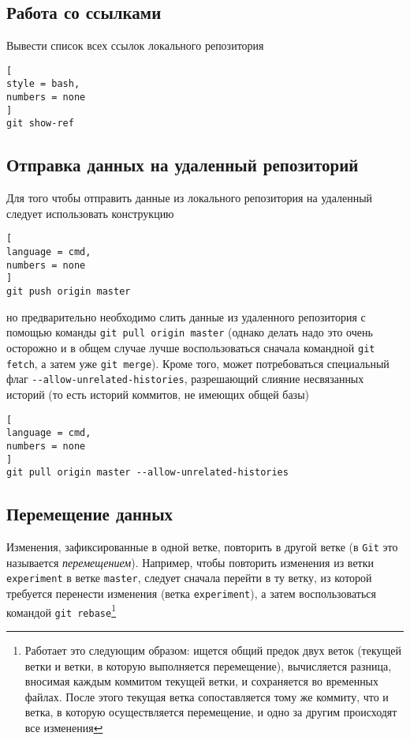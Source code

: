 \documentclass[%
	11pt,
	a4paper,
	utf8,
		]{article}
\begin{document}
\subsection{Работа со ссылками}

Вывести список всех ссылок локального репозитория
\begin{lstlisting}[
style = bash,
numbers = none
]
git show-ref
\end{lstlisting}


\subsection{Отправка данных на удаленный репозиторий}

Для того чтобы отправить данные из локального репозитория на удаленный следует использовать конструкцию

\begin{lstlisting}[
language = cmd,
numbers = none
]
git push origin master
\end{lstlisting}

\noindent но предварительно необходимо слить данные из удаленного репозитория с помощью команды \texttt{git pull origin master} (однако делать надо это очень осторожно и в общем случае лучше воспользоваться сначала командной \texttt{git fetch}, а затем уже \texttt{git merge}). Кроме того, может потребоваться специальный флаг \verb|--allow-unrelated-histories|, разрешающий слияние несвязанных историй (то есть историй коммитов, не имеющих общей базы)

\begin{lstlisting}[
language = cmd,
numbers = none
]
git pull origin master --allow-unrelated-histories
\end{lstlisting}


\subsection{Перемещение данных}

Изменения, зафиксированные в одной ветке, повторить в другой ветке (в \texttt{Git} это называется \emph{перемещением}). Например, чтобы повторить изменения из ветки \texttt{experiment} в ветке \texttt{master}, следует сначала перейти в ту ветку, из которой требуется перенести изменения (ветка \texttt{experiment}), а затем воспользоваться командой \texttt{git rebase}\footnote{Работает это следующим образом: ищется общий предок двух веток (текущей ветки и ветки, в которую выполняется перемещение), вычисляется разница, вносимая каждым коммитом текущей ветки, и сохраняется во временных файлах. После этого текущая ветка сопоставляется тому же коммиту, что и ветка, в которую осуществляется перемещение, и одно за другим происходят все изменения}
\end{document}
